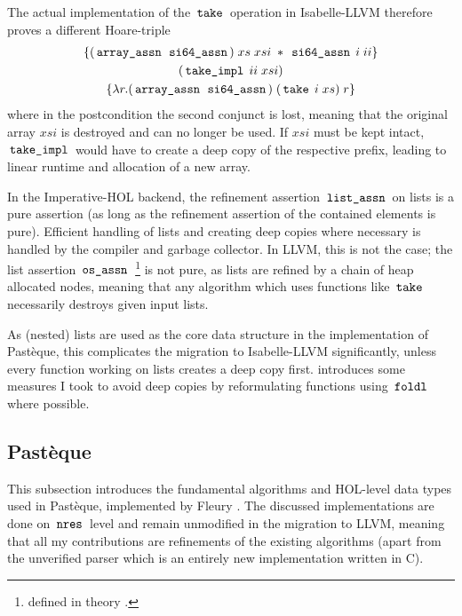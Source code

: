 The actual implementation of the $\,\text{\ttfamily take}\,$ operation in Isabelle-LLVM therefore proves a different Hoare-triple
\begin{gather*}
	\{(\,\text{\ttfamily array\_assn}\, \; \,\text{\ttfamily si64\_assn}\,) \; xs \; xsi \; \ast \; \,\text{\ttfamily si64\_assn}\, \; i \; ii\} \\
	(\,\text{\ttfamily take\_impl}\, \; ii \; xsi) \\
	\{\lambda r. (\,\text{\ttfamily array\_assn}\, \; \,\text{\ttfamily si64\_assn}\,) \; (\,\text{\ttfamily take}\, \; i \; xs) \; r\}
\end{gather*}
where in the postcondition the second conjunct is lost, meaning that the original array $xsi$ is destroyed and can no longer be used.
If $xsi$ must be kept intact, $\,\text{\ttfamily take\_impl}\,$ would have to create a deep copy of the respective prefix, leading to linear runtime and allocation of a new array.

In the Imperative-HOL backend, the refinement assertion $\,\text{\ttfamily list\_assn}\,$ on lists is a pure assertion (as long as the refinement assertion of the contained elements is pure).
Efficient handling of lists and creating deep copies where necessary is handled by the compiler and garbage collector.
In LLVM, this is not the case; the list assertion $\,\text{\ttfamily os\_assn}\,$ \footnote{defined in theory .} is not pure, as lists are refined by a chain of heap allocated nodes, meaning that any algorithm which uses functions like $\,\text{\ttfamily take}\,$ necessarily destroys given input lists.

As (nested) lists are used as the core data structure in the implementation of Pastèque, this complicates the migration to Isabelle-LLVM significantly, unless every function working on lists creates a deep copy first.
 introduces some measures I took to avoid deep copies by reformulating functions using $\,\text{\ttfamily foldl}\,$ where possible.

\subsection{Pastèque}\label{sec:methodology_high-level-representation-of-polynomials}
This subsection introduces the fundamental algorithms and HOL-level data types used in Pastèque, implemented by Fleury \cite{pasteque, pac-2024}.
The discussed implementations are done on $\,\text{\ttfamily nres}\,$ level and remain unmodified in the migration to LLVM, meaning that all my contributions are refinements of the existing algorithms (apart from the unverified parser which is an entirely new implementation written in C).

